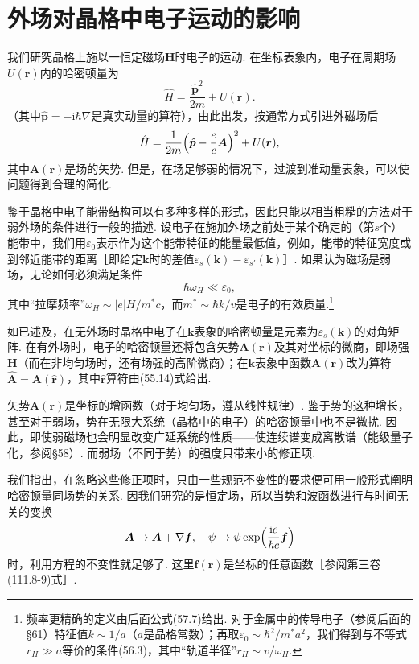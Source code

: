 \section{外场对晶格中电子运动的影响}

我们研究晶格上施以一恒定磁场$\bm H$时电子的运动. 在坐标表象内，电子在周期场$U(\bm r)$内的哈密顿量为
\begin{equation}
\hat H=\frac{\hat{\bm p}^2}{2m}+U(\bm r).
\label{56.1}
\end{equation}
（其中$\hat{\bm p}=-\mathrm i\hbar\nabla$是真实动量的算符），由此出发，按通常方式引进外磁场后
\begin{equation}
\hat H=\frac{1}{2m}\Bigl(\hat{\bm p}-\frac{e}{c}\bm A\Bigr)^2+U(\bm r),
\label{56.2}
\end{equation}
其中$\bm A(\bm r)$是场的矢势. 但是，在场足够弱的情况下，过渡到准动量表象，可以使问题得到合理的简化.

鉴于晶格中电子能带结构可以有多种多样的形式，因此只能以相当粗糙的方法对于弱外场的条件进行一般的描述. 设电子在施加外场之前处于某个确定的（第$s$个）能带中，我们用$\varepsilon_0$表示作为这个能带特征的能量最低值，例如，能带的特征宽度或到邻近能带的距离［即给定$\bm k$时的差值$\varepsilon_s(\bm k)-\varepsilon_{s'}(\bm k)$］. 如果认为磁场是弱场，无论如何必须满足条件
\begin{equation}
\hbar\omega_H\ll\varepsilon_0,
\label{56.3}
\end{equation}
其中“拉摩频率”$\omega_H\sim|e|H/m^{*}c$，而$m^{*}\sim\hbar k/v$是电子的有效质量.\footnote{频率更精确的定义由后面公式(57.7)给出. 对于金属中的传导电子（参阅后面的§61）特征值$k\sim1/a$（$a$是晶格常数）；再取$\varepsilon_0\sim\hbar^2/m^{*}a^2$，我们得到与不等式$r_H\gg a$等价的条件(56.3)，其中“轨道半径”$r_H\sim v/\omega_H$.}

如已述及，在无外场时晶格中电子在$\bm k$表象的哈密顿量是元素为$\varepsilon_s(\bm k)$的对角矩阵. 在有外场时，电子的哈密顿量还将包含矢势$\bm A(\bm r)$及其对坐标的微商，即场强$\bm H$（而在非均匀场时，还有场强的高阶微商）；在$\bm k$表象中函数$\bm A(\bm r)$改为算符$\hat{\bm A}=\bm A(\hat{\bm r})$，其中$\hat{\bm r}$算符由(55.14)式给出.

矢势$\bm A(\bm r)$是坐标的增函数（对于均匀场，遵从线性规律）. 鉴于势的这种增长，甚至对于弱场，势在无限大系统（晶格中的电子）的哈密顿量中也不是微扰. 因此，即使弱磁场也会明显改变广延系统的性质——使连续谱变成离散谱（能级量子化，参阅§58）. 而弱场（不同于势）的强度只带来小的修正项.

我们指出，在忽略这些修正项时，只由一些规范不变性的要求便可用一般形式阐明哈密顿量同场势的关系. 因我们研究的是恒定场，所以当势和波函数进行与时间无关的变换
\begin{equation}
\bm A\to\bm A+\nabla\bm f,\quad
\psi\to\psi\exp\Bigl(\frac{\mathrm i e}{\hbar c}\bm f\Bigr)
\label{56.4}
\end{equation}
时，利用方程的不变性就足够了. 这里$\bm f(\bm r)$是坐标的任意函数［参阅第三卷(111.8-9)式］.

